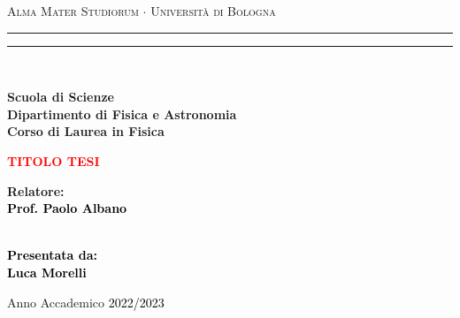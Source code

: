 \begin{titlepage}

\begin{center}
	{{\Large{\textsc{Alma Mater Studiorum $\cdot$ Universit\`a di Bologna}}}} 
	\rule[0.1cm]{15.8cm}{0.1mm}
	\rule[0.5cm]{15.8cm}{0.6mm}
	\\\vspace{3mm}
	
	{\small{\bf Scuola di Scienze \\ 
			Dipartimento di Fisica e Astronomia\\
			Corso di Laurea in Fisica}}
	
\end{center}

\vspace{23mm}

\begin{center}\textcolor{red}{
		{\LARGE{\bf TITOLO TESI}}\\
}\end{center}

\vspace{50mm} \par \noindent

\begin{minipage}[t]{0.47\textwidth}
	\large{\bf Relatore: \vspace{2mm}\\\textcolor{black}{
				Prof. Paolo Albano}}\\\\
\end{minipage}
%
\hfill
%
\begin{minipage}[t]{0.47\textwidth}\raggedleft \textcolor{black}{
		{\large{\bf Presentata da:
				\vspace{2mm}\\
				Luca Morelli}}}
\end{minipage}

\vspace{40mm}

\begin{center}
	Anno Accademico \textcolor{black}{ 2022/2023}
\end{center}


\end{titlepage}